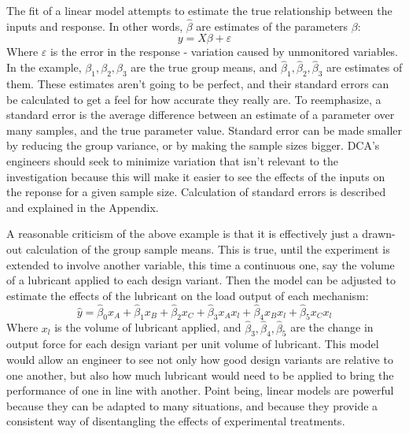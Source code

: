 \documentclass[11pt,a4paper,article]{memoir} %
\begin{document}
The fit of a linear model attempts to estimate the true relationship between the inputs and response. In other words, $\hat{\beta}$ are estimates of the parameters $\beta$:
\begin{equation}
	y = X\beta + \varepsilon
\end{equation}
Where $\varepsilon$ is the error in the response - variation caused by unmonitored variables. In the example, $\beta_1, \beta_2, \beta_3$ are the true group means, and $\hat{\beta}_1, \hat{\beta}_2, \hat{\beta}_3$ are estimates of them. These estimates aren't going to be perfect, and their standard errors can be calculated to get a feel for how accurate they really are. To reemphasize, a standard error is the average difference between an estimate of a parameter over many samples, and the true parameter value. Standard error can be made smaller by reducing the group variance, or by making the sample sizes bigger.  DCA's engineers should seek to minimize variation that isn't relevant to the investigation because this will make it easier to see the effects of the inputs on the reponse for a given sample size. Calculation of standard errors is described and explained in the Appendix.

A reasonable criticism of the above example is that it is effectively just a drawn-out calculation of the group sample means. This is true, until the experiment is extended to involve another variable, this time a continuous one, say the volume of a lubricant applied to each design variant. Then the model can be adjusted to estimate the effects of the lubricant on the load output of each mechanism:
\begin{equation}
	\hat{y} = \hat{\beta}_0 x_A + \hat{\beta}_{1}x_B + \hat{\beta}_{2}x_C + \hat{\beta}_3 x_A x_l + \hat{\beta}_4 x_B x_l + \hat{\beta}_5 x_C x_l
\end{equation}
Where $x_l$ is the volume of lubricant applied, and $\hat{\beta}_3, \hat{\beta}_4, \hat{\beta}_5$ are the change in output force for each design variant per unit volume of lubricant. This model would allow an engineer to see not only how good design variants are relative to one another, but also how much lubricant would need to be applied to bring the performance of one in line with another. Point being, linear models are powerful because they can be adapted to many situations, and because they provide a consistent way of disentangling the effects of experimental treatments.
\end{document}
